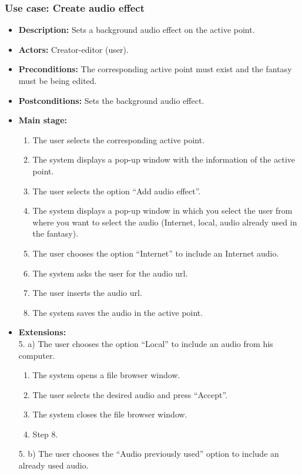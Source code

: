 \subsubsection{Use case: Create audio effect}
\begin{itemize}
	\item \textbf{Description:} Sets a background audio effect on the active point.
	\item \textbf{Actors:} Creator-editor (user).
	\item \textbf{Preconditions:} The corresponding active point must exist and the fantasy must be being edited.
	\item \textbf{Postconditions:} Sets the background audio effect.
	\item \textbf{Main stage:}
	\begin{enumerate}
		\item The user selects the corresponding active point.
		\item The system displays a pop-up window with the information of the active point.
		\item The user selects the option ``Add audio effect''.
		\item The system displays a pop-up window in which you select the user from where you want to select the audio (Internet, local, audio already used in the fantasy).
		\item The user chooses the option ``Internet'' to include an Internet audio.
		\item The system asks the user for the audio url.
		\item The user inserts the audio url.
		\item The system saves the audio in the active point.
	\end{enumerate}
	\item \textbf{Extensions:} \\ 5. a) The user chooses the option ``Local'' to include an audio from his computer.
	\begin{enumerate}
		\item The system opens a file browser window.
		\item The user selects the desired audio and press ``Accept''.
		\item The system closes the file browser window.
		\item Step 8.
	\end{enumerate}
	5. b) The user chooses the ``Audio previously used'' option to include an already used audio.
	\begin{enumerate}

\end{enumerate}
\end{itemize}
